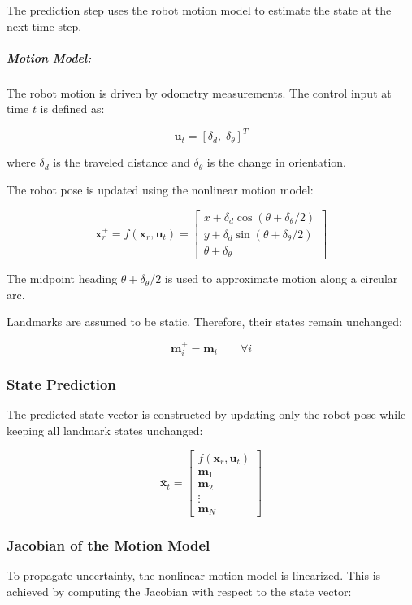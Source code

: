\documentclass[11pt]{article}
\begin{document}
The prediction step uses the robot motion model to estimate the state at the next time step.

\subparagraph{Motion Model:}

The robot motion is driven by odometry measurements. The control input at time $t$ is defined as:

\[
\mathbf{u}_t = [\delta_d,\; \delta_\theta]^T
\]

where $\delta_d$ is the traveled distance and $\delta_\theta$ is the change in orientation.

The robot pose is updated using the nonlinear motion model:

\[
\mathbf{x}_r^+ = f(\mathbf{x}_r, \mathbf{u}_t)
=
\begin{bmatrix}
	x + \delta_d \cos(\theta + \delta_\theta / 2) \\
	y + \delta_d \sin(\theta + \delta_\theta / 2) \\
	\theta + \delta_\theta
\end{bmatrix}
\]

The midpoint heading $\theta + \delta_\theta/2$ is used to approximate motion along a circular arc.


Landmarks are assumed to be static.
Therefore, their states remain unchanged:

\[
\mathbf{m}_i^+ = \mathbf{m}_i \qquad \forall i
\]

\subsubsection{State Prediction}

The predicted state vector is constructed by
updating only the robot pose while keeping
all landmark states unchanged:

\[
\bar{\mathbf{x}}_t =
\begin{bmatrix}
	f(\mathbf{x}_r, \mathbf{u}_t) \\
	\mathbf{m}_1 \\
	\mathbf{m}_2 \\
	\vdots \\
	\mathbf{m}_N
\end{bmatrix}
\]

\subsubsection{Jacobian of the Motion Model}

To propagate uncertainty,
the nonlinear motion model is linearized.
This is achieved by computing the Jacobian
with respect to the state vector:
\end{document}
